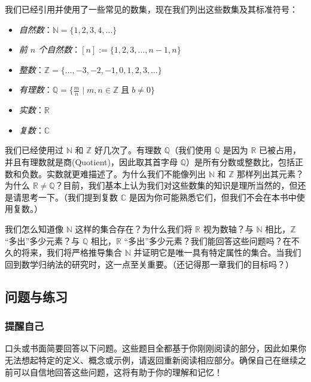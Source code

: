 我们已经引用并使用了一些常见的数集，现在我们列出这些数集及其标准符号：

\begin{center}
\begin{itemize}
    \item \emph{自然数}：$\mathbb{N} = \{1, 2, 3, 4, \dots \}$
    \item \emph{前 $n$ 个自然数}：$[n] := \{1, 2, 3, \dots , n-1, n \}$
    \item \emph{整数}：$\mathbb{Z} = \{\dots, -3, -2, -1, 0, 1, 2, 3, \dots \}$
    \item \emph{有理数}：$\mathbb{Q} = \{\frac{m}{n} \mid m,n \in \mathbb{Z} \;\text{且}\; b \ne 0 \}$
    \item \emph{实数}：$\mathbb{R}$
    \item \emph{复数}：$\mathbb{C}$
\end{itemize}
\end{center}

我们已经使用过 $\mathbb{N}$ 和 $\mathbb{Z}$ 好几次了。有理数 $\mathbb{Q}$（我们使用 $\mathbb{Q}$ 是因为 $\mathbb{R}$ 已被占用，并且有理数就是商(Quotient)，因此取其首字母 $\mathbb{Q}$）是所有分数或整数比，包括正数和负数。实数就更难描述了。为什么我们不能像列出 $\mathbb{N}$ 和 $\mathbb{Z}$ 那样列出其元素？为什么 $\mathbb{R} \ne \mathbb{Q}$？目前，我们基本上认为我们对这些数集的知识是理所当然的，但还是请思考一下。（我们提到复数 $\mathbb{C}$ 是因为你可能熟悉它们，但我们不会在本书中使用复数。）

我们怎么知道像 $\mathbb{N}$ 这样的集合存在？为什么我们将 $\mathbb{R}$ 视为数轴？与 $\mathbb{N}$ 相比，$\mathbb{Z}$ ``多出''多少元素？与 $\mathbb{Q}$ 相比，$\mathbb{R}$ ``多出''多少元素？我们能回答这些问题吗？在不久的将来，我们将严格推导集合 $\mathbb{N}$ 并证明它是唯一具有特定属性的集合。当我们回到数学归纳法的研究时，这一点至关重要。（还记得那一章我们的目标吗？）

\subsection{问题与练习}

\subsubsection*{提醒自己}

口头或书面简要回答以下问题。这些题目全都基于你刚刚阅读的部分，因此如果你无法想起特定的定义、概念或示例，请返回重新阅读相应部分。确保自己在继续之前可以自信地回答这些问题，这将有助于你的理解和记忆！

